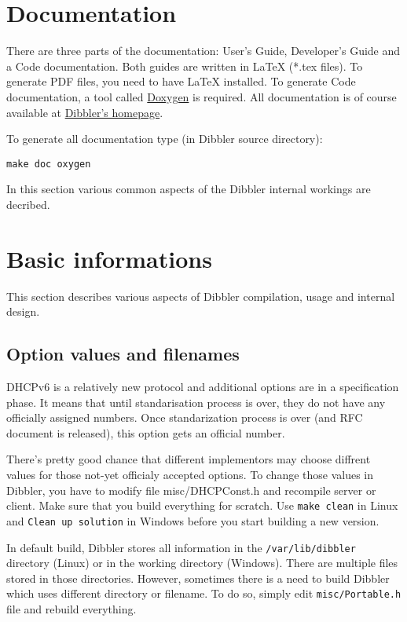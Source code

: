 
\section{Documentation}
There are three parts of the documentation: User's Guide, Developer's
Guide and a Code documentation. Both guides are written in \LaTeX
(*.tex files). To generate PDF files, you need to have \LaTeX
installed. To generate Code documentation, 
a tool called \href{http://www.doxygen.org}{Doxygen} is required. All
documentation is of course available at
\href{http://klub.com.pl/dhcpv6}{Dibbler's homepage}.

To generate all documentation type (in Dibbler source directory):
\begin{verbatim}
make doc oxygen
\end{verbatim}

In this section various common aspects of the Dibbler internal
workings are decribed.

\section{Basic informations}
This section describes various aspects of Dibbler compilation, usage
and internal design.

\subsection{Option values and filenames}

DHCPv6 is a relatively new protocol and additional options are in a
specification phase. It means that until standarisation process is
over, they do not have any officially assigned numbers. Once
standarization process is over (and RFC document is released), this
option gets an official number. 

There's pretty good chance that different implementors may choose
diffrent values for those not-yet officialy accepted options. To
change those values in Dibbler, you have to modify file
misc/DHCPConst.h and recompile server or client. Make sure that you
build everything for scratch. Use \verb+make clean+ in Linux and
\verb+Clean up solution+ in Windows before you start building a new
version.

In default build, Dibbler stores all information in the
\verb+/var/lib/dibbler+ directory (Linux) or in the working directory
(Windows). There are multiple files stored in those
directories. However, sometimes there is a need to build Dibbler which uses
different directory or filename. To do so, simply edit
\verb+misc/Portable.h+ file and rebuild everything.

